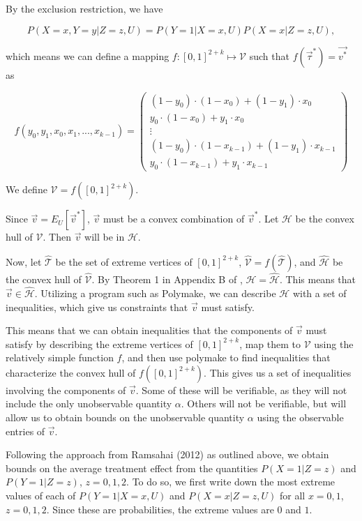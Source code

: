 \documentclass[
]{article}
\theoremstyle{plain}
\begin{document}
By the exclusion restriction, we have

\[
P(X = x, Y = y | Z = z, U) = P(Y = 1 | X = x, U) P(X = x | Z = z, U),
\]

which means we can define a mapping \(f:[0,1]^{2+k} \mapsto \mathcal{V}\) such that \(f(\vec{\tau}^*) = \vec{v^*}\) as

\[
f(y_0, y_1, x_0, x_1, ..., x_{k-1}) =
  \begin{pmatrix}
    (1-y_0)\cdot(1-x_0) + (1 - y_1)\cdot x_0 \\
    y_0\cdot (1-x_0) + y_1\cdot x_0 \\
    \vdots \\
    (1-y_0)\cdot(1-x_{k-1}) + (1 - y_1)\cdot x_{k-1} \\
    y_0\cdot (1-x_{k-1}) + y_1\cdot x_{k-1}
  \end{pmatrix} \label{eq:f}
\]

We define \(\mathcal{V} = f([0,1]^{2+k})\).

Since \(\vec{v} = E_U[\vec{v}^*]\), \(\vec{v}\) must be a convex combination of \(\vec{v}^*\). Let \(\mathcal{H}\) be the convex hull of \(\mathcal{V}\). Then \(\vec{v}\) will be in \(\mathcal{H}\).

Now, let \(\hat{\mathcal{T}}\) be the set of extreme vertices of \([0,1]^{2+k}\), \(\hat{\mathcal{V}} = f(\hat{\mathcal{T}})\), and \(\hat{\mathcal{H}}\) be the convex hull of \(\hat{\mathcal{V}}\). By Theorem 1 in Appendix B of \textcite{ramsahai_causal_2012}, \(\mathcal{H} = \mathcal{\hat{H}}\). This means that \(\vec{v} \in \mathcal{\hat{H}}\). Utilizing a program such as Polymake, we can describe \(\mathcal{H}\) with a set of inequalities, which give us constraints that \(\vec{v}\) must satisfy.

This means that we can obtain inequalities that the components of \(\vec{v}\) must satisfy by describing the extreme vertices of \([0,1]^{2+k}\), map them to \(\mathcal{V}\) using the relatively simple function \(f\), and then use polymake to find inequalities that characterize the convex hull of \(f([0,1]^{2+k})\). This gives us a set of inequalities involving the components of \(\vec{v}\). Some of these will be verifiable, as they will not include the only unobservable quantity \(\alpha\). Others will not be verifiable, but will allow us to obtain bounds on the unobservable quantity \(\alpha\) using the observable entries of \(\vec{v}\).

Following the approach from Ramsahai (2012) as outlined above, we obtain bounds on the average treatment effect from the quantities \(P(X = 1 | Z = z)\) and \(P(Y = 1 | Z = z)\), \(z = 0,1,2\). To do so, we first write down the most extreme values of each of \(P(Y = 1 | X = x, U)\) and \(P(X = x | Z = z, U)\) for all \(x=0,1\), \(z=0,1,2\). Since these are probabilities, the extreme values are \(0\) and \(1\).
\end{document}
